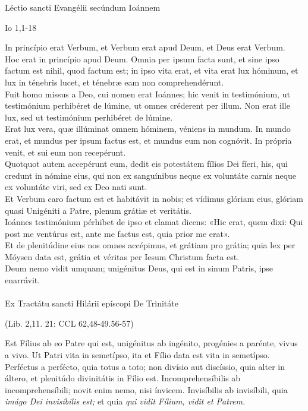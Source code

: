 \documentclass[options]{article}
\begin{document}
	Léctio sancti Evangélii secúndum Ioánnem 
	\begin{flushright}
		Io 1,1-18	
	\end{flushright}	
In princípio erat Verbum, et Verbum erat apud Deum, et Deus erat Verbum.\\
Hoc erat in princípio apud Deum. Omnia per ipsum facta sunt, et sine ipso factum est nihil, quod factum est; in ipso vita erat, et vita erat lux hóminum, et lux in ténebris lucet, et ténebræ eam non comprehendérunt.\\
Fuit homo missus a Deo, cui nomen erat Ioánnes; hic venit in testimónium, ut testimónium perhibéret de lúmine, ut omnes créderent per illum. Non erat ille lux, sed ut testimónium perhibéret de lúmine.\\
Erat lux vera, quæ illúminat omnem hóminem, véniens in mundum. In mundo erat, et mundus per ipsum factus est, et mundus eum non cognóvit. In própria venit, et sui eum non recepérunt.\\
Quotquot autem accepérunt eum, dedit eis potestátem fílios Dei fíeri, his, qui credunt in nómine eius, qui non ex sanguínibus neque ex voluntáte carnis neque ex voluntáte viri, sed ex Deo nati sunt.\\
Et Verbum caro factum est et habitávit in nobis; et vídimus glóriam eius, glóriam quasi Unigéniti a Patre, plenum grátiæ et veritátis.\\
Ioánnes testimónium pérhibet de ipso et clamat dicens: «Hic erat, quem dixi: Qui post me ventúrus est, ante me factus est, quia prior me erat».\\
Et de plenitúdine eius nos omnes accépimus, et grátiam pro grátia; quia lex per Móysen data est, grátia et véritas per Iesum Christum facta est.\\
Deum nemo vidit umquam; unigénitus Deus, qui est in sinum Patris, ipse enarrávit.\\
	\\
Ex Tractátu sancti Hilárii epíscopi De Trinitáte
	\begin{flushright}
		(Lib. 2,11. 21: CCL 62,48-49.56-57)	
	\end{flushright}
Est Fílius ab eo Patre qui est, unigénitus ab ingénito, progénies a parénte, vivus a vivo. Ut Patri vita in semetípso, ita et Fílio data est vita in semetípso. Perféctus a perfécto, quia totus a toto; non divísio aut discíssio, quia alter in áltero, et plenitúdo divinitátis in Fílio est. Incomprehensíbilis ab incomprehensíbili; novit enim nemo, nisi ínvicem. Invisíbilis ab invisíbili, quia \emph{imágo Dei invisíbilis est;} et quia \emph{qui vidit Fílium, vidit et Patrem.}\\
\end{document}
